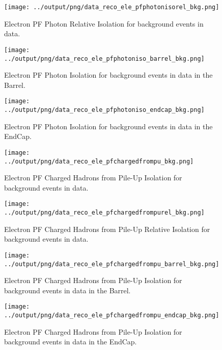 \documentclass[11pt]{book}
\begin{document}
\begin{figure}[htb]
\centering
\texttt{[image: ../output/png/data\_reco\_ele\_pfphotonisorel\_bkg.png]}
\caption{Electron PF Photon Relative Isolation for background events in data.}
\label{fig:data_ele_pfphotonisorel_bkg}
\end{figure}

\begin{figure}[htb]
\centering
\texttt{[image: ../output/png/data\_reco\_ele\_pfphotoniso\_barrel\_bkg.png]}
\caption{Electron PF Photon Isolation for background events in data in the Barrel.}
\label{fig:data_ele_pfphotoniso_barrel_bkg}
\end{figure}

\begin{figure}[htb]
\centering
\texttt{[image: ../output/png/data\_reco\_ele\_pfphotoniso\_endcap\_bkg.png]}
\caption{Electron PF Photon Isolation for background events in data in the EndCap.}
\label{fig:data_ele_pfphotoniso_endcap_bkg}
\end{figure}


\begin{figure}[htb]
\centering
\texttt{[image: ../output/png/data\_reco\_ele\_pfchargedfrompu\_bkg.png]}
\caption{Electron PF Charged Hadrons from Pile-Up Isolation for background events in data.}
\label{fig:data_ele_pfchargedfrompu_bkg}
\end{figure}

\begin{figure}[htb]
\centering
\texttt{[image: ../output/png/data\_reco\_ele\_pfchargedfrompurel\_bkg.png]}
\caption{Electron PF Charged Hadrons from Pile-Up Relative Isolation for background events in data.}
\label{fig:data_ele_pfchargedfrompurel_bkg}
\end{figure}

\begin{figure}[htb]
\centering
\texttt{[image: ../output/png/data\_reco\_ele\_pfchargedfrompu\_barrel\_bkg.png]}
\caption{Electron PF Charged Hadrons from Pile-Up Isolation for background events in data in the Barrel.}
\label{fig:data_ele_pfchargedfrompu_barrel_bkg}
\end{figure}

\begin{figure}[htb]
\centering
\texttt{[image: ../output/png/data\_reco\_ele\_pfchargedfrompu\_endcap\_bkg.png]}
\caption{Electron PF Charged Hadrons from Pile-Up Isolation for background events in data in the EndCap.}
\label{fig:data_ele_pfchargedfrompu_endcap_bkg}
\end{figure}
\end{document}
